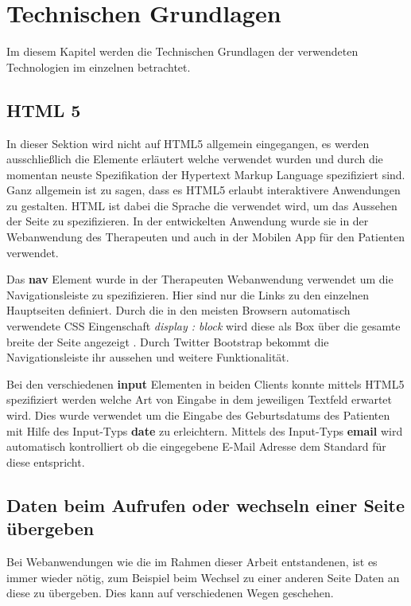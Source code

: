 \chapter{Technischen Grundlagen} \label{Theoretische Grundlagen}
Im diesem Kapitel werden die Technischen Grundlagen der verwendeten Technologien im einzelnen betrachtet.
\section{HTML 5}
In dieser Sektion wird nicht auf HTML5 allgemein eingegangen, es werden ausschließlich die Elemente erläutert welche verwendet wurden und durch die momentan neuste Spezifikation der Hypertext Markup Language spezifiziert sind. Ganz allgemein ist zu sagen, dass es HTML5 erlaubt interaktivere Anwendungen zu gestalten. HTML ist dabei die Sprache die verwendet wird, um das Aussehen der Seite zu spezifizieren. In der entwickelten Anwendung wurde sie in der Webanwendung des Therapeuten und auch in der Mobilen App für den Patienten verwendet.

Das \textbf{nav} Element wurde in der Therapeuten Webanwendung verwendet um die Navigationsleiste zu spezifizieren. Hier sind nur die Links zu den einzelnen Hauptseiten definiert. Durch die in den meisten Browsern automatisch verwendete CSS Eingenschaft \textit{display : block} wird diese als Box über die gesamte breite der Seite angezeigt \cite{SELFHTMLD16}. Durch Twitter Bootstrap bekommt die Navigationsleiste ihr aussehen und weitere Funktionalität.

Bei den verschiedenen \textbf{input} Elementen in beiden Clients konnte mittels HTML5 spezifiziert werden welche Art von Eingabe in dem jeweiligen Textfeld erwartet wird. Dies wurde verwendet um die Eingabe des Geburtsdatums des Patienten mit Hilfe des Input-Typs \textbf{date} zu erleichtern. Mittels des Input-Typs \textbf{email} wird automatisch kontrolliert ob die eingegebene E-Mail Adresse dem Standard für diese entspricht.

\section{Daten beim Aufrufen oder wechseln einer Seite übergeben}
Bei Webanwendungen wie die im Rahmen dieser Arbeit entstandenen, ist es immer wieder nötig, zum Beispiel beim Wechsel zu einer anderen Seite Daten an diese zu übergeben. Dies kann auf verschiedenen Wegen geschehen.

